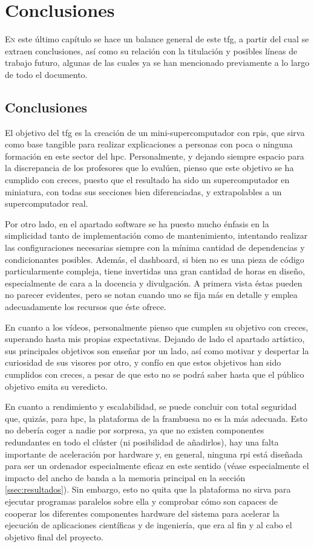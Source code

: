\chapter{Conclusiones}
\label{chap:conclusiones}

\lettrine{E}{n} este último capítulo se hace un balance general de este \acrlong{tfg}, a partir del cual se extraen conclusiones, así como su relación con la titulación y posibles líneas de trabajo futuro, algunas de las cuales ya se han mencionado previamente a lo largo de todo el documento.

\section{Conclusiones}
El objetivo del \acrshort{tfg} es la creación de un mini-supercomputador con \acrlong{rpi}s, que sirva como base tangible para realizar explicaciones a personas con poca o ninguna formación en este sector del \acrshort{hpc}. Personalmente, y dejando siempre espacio para la discrepancia de los profesores que lo evalúen, pienso que este objetivo se ha cumplido con creces, puesto que el resultado ha sido un supercomputador en miniatura, con todas sus secciones bien diferenciadas, y extrapolables a un supercomputador real. 

Por otro lado, en el apartado software se ha puesto mucho énfasis en la simplicidad tanto de implementación como de mantenimiento, intentando realizar las configuraciones necesarias siempre con la mínima cantidad de dependencias y condicionantes posibles. Además, el dashboard, si bien no es una pieza de código particularmente compleja, tiene invertidas una gran cantidad de horas en diseño, especialmente de cara a la docencia y divulgación. A primera vista éstas pueden no parecer evidentes, pero se notan cuando uno se fija más en detalle y emplea adecuadamente los recursos que éste ofrece.

En cuanto a los vídeos, personalmente pienso que cumplen su objetivo con creces, superando hasta mis propias expectativas. Dejando de lado el apartado artístico, sus principales objetivos son enseñar por un lado, así como motivar y despertar la curiosidad de sus visores por otro, y confío en que estos objetivos han sido cumplidos con creces, a pesar de que esto no se podrá saber hasta que el público objetivo emita su veredicto.

En cuanto a rendimiento y escalabilidad, se puede concluir con total seguridad que, quizás, para \acrshort{hpc}, la plataforma de la frambuesa no es la más adecuada. Esto no debería coger a nadie por sorpresa, ya que no existen componentes redundantes en todo el clúster (ni posibilidad de añadirlos), hay una falta importante de aceleración por hardware y, en general, ninguna \acrlong{rpi} está diseñada para ser un ordenador especialmente eficaz en este sentido (véase especialmente el impacto del ancho de banda a la memoria principal en la sección \ref{ssec:resultados}). Sin embargo, esto no quita que la plataforma no sirva para ejecutar programas paralelos sobre ella y comprobar cómo son capaces de cooperar los diferentes componentes hardware del sistema para acelerar la ejecución de aplicaciones científicas y de ingeniería, que era al fin y al cabo el objetivo final del proyecto.

